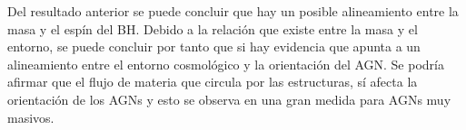 Del resultado anterior se puede concluir que hay un posible alineamiento entre la masa y el espín del BH. Debido a la relación que existe entre la masa y el entorno, se puede concluir por tanto que si hay evidencia que apunta a un alineamiento entre el entorno cosmológico y la orientación del AGN. Se podría afirmar que el flujo de materia que circula por las estructuras, sí afecta la orientación de los AGNs y esto se observa en una gran medida para AGNs muy masivos.





